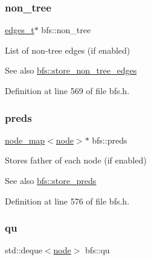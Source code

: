 \subsubsection{\texorpdfstring{non\+\_\+tree}{non\_tree}}
{\footnotesize\ttfamily \mbox{\hyperlink{edge_8h_a8f9587479bda6cf612c103494b3858e3}{edges\+\_\+t}}$\ast$ bfs\+::non\+\_\+tree\hspace{0.3cm}{\ttfamily [protected]}}



List of non-\/tree edges (if enabled) 

\begin{DoxySeeAlso}{See also}
\mbox{\hyperlink{classbfs_a7de47b820fb9532f497660f767c9457f}{bfs\+::store\+\_\+non\+\_\+tree\+\_\+edges}} 
\end{DoxySeeAlso}


Definition at line 569 of file bfs.\+h.

\mbox{\label{classbfs_a3bac5ed333bb78a30a67099c3b94aa0c}} 
\subsubsection{\texorpdfstring{preds}{preds}}
{\footnotesize\ttfamily \mbox{\hyperlink{classnode__map}{node\+\_\+map}}$<$\mbox{\hyperlink{classnode}{node}}$>$$\ast$ bfs\+::preds\hspace{0.3cm}{\ttfamily [protected]}}



Stores father of each node (if enabled) 

\begin{DoxySeeAlso}{See also}
\mbox{\hyperlink{classbfs_a8c7ce0ea2cd8e1932d1da5693d90cf61}{bfs\+::store\+\_\+preds}} 
\end{DoxySeeAlso}


Definition at line 576 of file bfs.\+h.

\mbox{\label{classbfs_ad2ef1030dcc16a1056e6ef6dfc3f1b6b}} 
\subsubsection{\texorpdfstring{qu}{qu}}
{\footnotesize\ttfamily std\+::deque$<$\mbox{\hyperlink{classnode}{node}}$>$ bfs\+::qu\hspace{0.3cm}{\ttfamily [protected]}}



